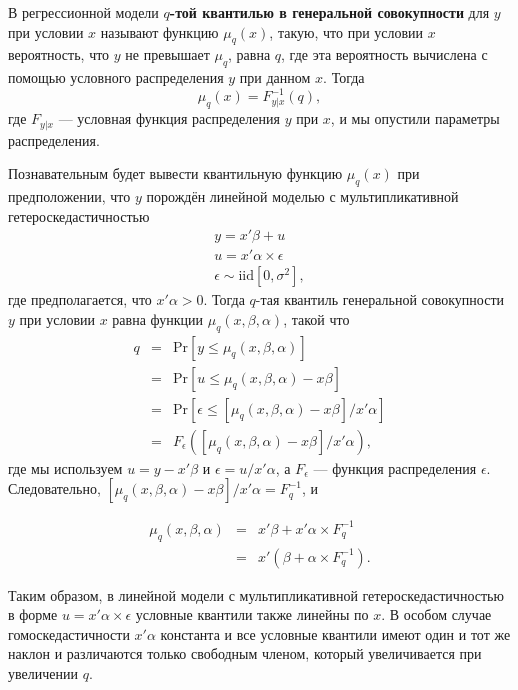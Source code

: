 В регрессионной модели \textbf{$q$-той квантилью в генеральной совокупности} для $y$ при условии $x$ называют функцию $\mu_q(x)$, такую, что при условии $x$ вероятность, что $y$ не превышает  $\mu_q$, равна $q$, где эта вероятность вычислена с помощью условного распределения $y$ при данном $x$. Тогда
\begin{equation}
\mu_q(x) = F^{-1}_{y|x}(q),
\end{equation}
где $F_{y|x}$ --- условная функция распределения $y$ при $x$, и мы опустили  параметры  распределения.

Познавательным будет вывести квантильную функцию $\mu_q(x)$ при предположении, что $y$ порождён линейной моделью с мультипликативной гетероскедастичностью
\[
\begin{array}{c} 
y = x'\beta + u \\ 
u = x'\alpha \times \epsilon \\
\epsilon \sim\mathrm{iid} [0, \sigma^2],
\end{array}
\]
где предполагается, что $x'\alpha > 0$. Тогда $q$-тая квантиль генеральной совокупности $y$  при условии $x$ равна  функции $\mu_q(x,\beta,\alpha)$, такой что
\[
\begin{array}{rcl} 
q & = & \mathrm{Pr} [y\leq \mu_q(x,\beta,\alpha)] \\
& = & \mathrm{Pr} [u \leq \mu_q(x,\beta,\alpha) - x\beta] \\
& = & \mathrm{Pr} [\epsilon \leq [\mu_q(x,\beta,\alpha) - x\beta]/x'\alpha] \\
& = & F_{\epsilon} ([\mu_q(x,\beta,\alpha) - x\beta]/x'\alpha),
\end{array}
\]
где мы используем $u = y-x'\beta$ и $\epsilon = u/x'\alpha$, а $F_{\epsilon}$ --- функция распределения $\epsilon$. Следовательно, $[\mu_q(x,\beta,\alpha) - x\beta]/x'\alpha =F^{-1}_q$, и 

\[
\begin{array}{rcl}
\mu_q(x,\beta,\alpha) & = & x'\beta +x'\alpha \times F^{-1}_q \\
& = & x' (\beta + \alpha \times F^{-1}_q).
\end{array}
\]

Таким образом, в линейной модели с мультипликативной гетероскедастичностью в форме $u = x'\alpha \times \epsilon$ условные квантили также линейны по $x$. В особом случае гомоскедастичности $x'\alpha$ константа и все условные квантили имеют один и тот же наклон и различаются только свободным членом, который увеличивается при увеличении $q$.

